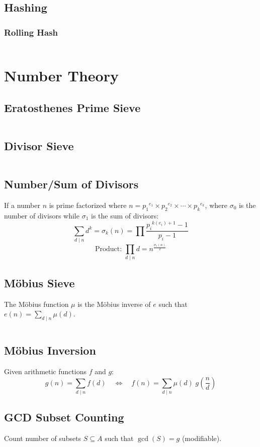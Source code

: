 \documentclass[8pt,a4paper,landscape,oneside]{amsart}
\newcommand{\code}[1]{\inputminted[fontsize=\normalsize,baselinestretch=1]{cpp}{_code/#1}}
\begin{document}
\begin{multicols*}{3}
	\subsection{Hashing}
    \subsubsection{Rolling Hash}
      \code{strings/rolling_hash.cpp}
\section{Number Theory}
	\subsection{Eratosthenes Prime Sieve}
    \code{numtheory/prime-sieve.cpp}
  \subsection{Divisor Sieve}
    \code{numtheory/divisor-sieve.cpp}
  \subsection{Number/Sum of Divisors}
    If a number $n$ is prime factorized where $n = {p_1}^{e_1} \times {p_2}^{e_2} \times \cdots \times {p_k}^{e_k}$, where $\sigma_0$ is the number of divisors while $\sigma_1$ is the sum of divisors:
    \[
    \sum_{d\mid n} d^k = \sigma_k (n) = \prod \frac{{p_i}^{k(e_i)+1}-1}{p_i -1}
    \]
    \[
    \text{Product: } \prod_{d\mid n} d = n^{\frac{\sigma_1 (n)}{2}}
    \]
  \subsection{M\"{o}bius Sieve}
    The M\"{o}bius function $\mu$ is the M\"{o}bius inverse of $e$ such that $e(n) = \sum_{d\mid n} \mu(d)$.
    \code{numtheory/moebius-sieve.cpp}
  \subsection{M\"{o}bius Inversion}
    Given arithmetic functions $f$ and $g$:
    \[
    g(n) = \sum_{d\mid n} f(d) \quad \Leftrightarrow \quad f(n) = \sum_{d\mid n} \mu(d)\; g\left(\frac{n}{d}\right)
    \]
  \subsection{GCD Subset Counting}
    Count number of subsets $S \subseteq A$ such that $\gcd(S) = g$ (modifiable).
    \code{numtheory/gcd-subsets.cpp}

\end{multicols*}
\end{document}
